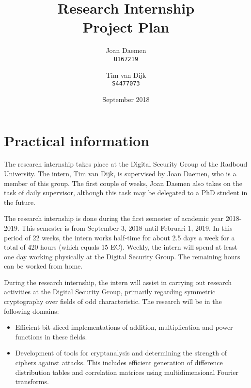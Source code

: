 \documentclass{article}
\title{Research Internship\\
Project Plan}
\author{
  Joan Daemen\\
  \texttt{U167219}
  \and
  Tim van Dijk\\
  \texttt{S4477073}
}
\date{September 2018}
\begin{document}
\maketitle


\section{Practical information}
The research internship takes place at the Digital Security Group of the Radboud University.
The intern, Tim van Dijk, is supervised by Joan Daemen, who is a member of this group.
The first couple of weeks, Joan Daemen also takes on the task of daily supervisor, although this task may be delegated to a PhD student in the future.

The research internship is done during the first semester of academic year 2018-2019. This semester is from September 3, 2018 until Februari 1, 2019. 
In this period of 22 weeks, the intern works half-time for about 2.5 days a week for a total of 420 hours (which equals 15 EC).
Weekly, the intern will spend at least one day working physically at the Digital Security Group. The remaining hours can be worked from home.

During the research internship, the intern will assist in carrying out research activities at the Digital Security Group, primarily regarding symmetric cryptography over fields of odd characteristic. The research will be in the following domains:
\begin{itemize}
\item Efficient bit-sliced implementations of addition, multiplication and power functions in these fields.
\item Development of tools for cryptanalysis and determining the strength of ciphers against attacks. This includes efficient generation of difference distribution tables and correlation matrices using multidimensional Fourier transforms.
\end{itemize}
\end{document}
